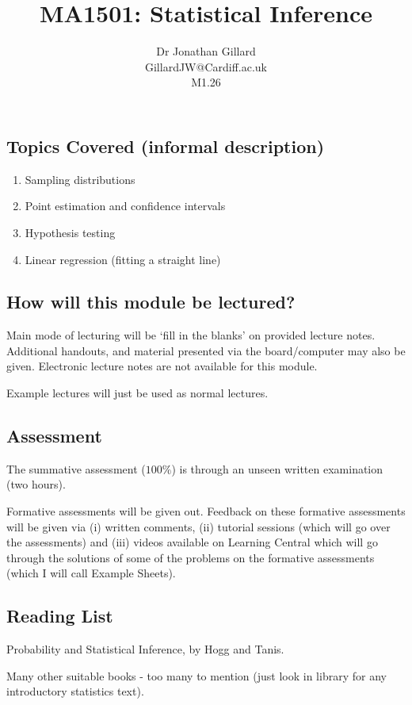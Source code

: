 \documentclass[12pt]{article}
\title{MA1501: Statistical Inference}
\author{Dr Jonathan Gillard\\GillardJW@Cardiff.ac.uk\\M1.26}
\date{}
\begin{document}
\maketitle

\subsection*{Topics Covered (informal description)}
\begin{enumerate}
\item{Sampling distributions}
\item{Point estimation and confidence intervals}
\item{Hypothesis testing}
\item{Linear regression (fitting a straight line)}

\end{enumerate}

\subsection*{How will this module be lectured?}
Main mode of lecturing will be `fill in the blanks' on provided lecture notes.  Additional handouts, and material presented via the board/computer may also be given. Electronic lecture notes are not available for this module.

Example lectures will just be used as normal lectures.



\subsection*{Assessment}
The summative assessment ($100\%$) is through an unseen written examination (two hours).

Formative assessments will be given out. Feedback on these formative assessments will be given via (i) written comments, (ii) tutorial sessions (which will go over the assessments) and (iii) videos available on Learning Central which will go through the solutions of some of the problems on the formative assessments (which I will call Example Sheets).

\subsection*{Reading List}
Probability and Statistical Inference, by Hogg and Tanis.

Many other suitable books - too many to mention (just look in library for any introductory statistics text).
\end{document}
